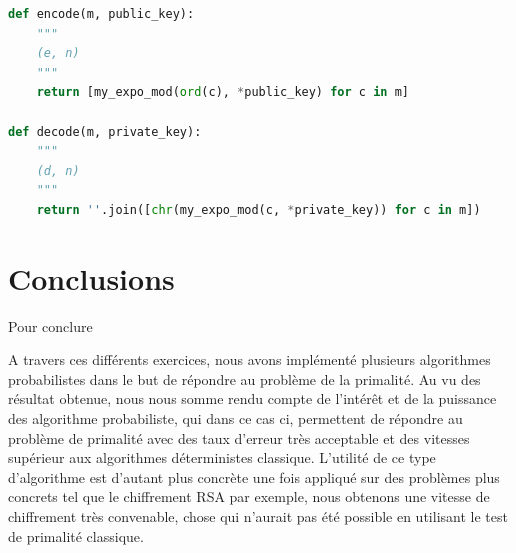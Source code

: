 \documentclass{article}
\begin{document}
\begin{lstlisting}[language=Python, caption=Encodage et décodage]
def encode(m, public_key):
    """
    (e, n)
    """
    return [my_expo_mod(ord(c), *public_key) for c in m]

def decode(m, private_key):
    """
    (d, n)
    """
    return ''.join([chr(my_expo_mod(c, *private_key)) for c in m])
\end{lstlisting}



\section{Conclusions}

Pour conclure

A travers ces différents exercices, nous avons implémenté plusieurs algorithmes probabilistes dans le but de répondre au problème de la primalité. Au vu des résultat obtenue, nous nous somme rendu compte de l'intérêt et de la puissance des algorithme probabiliste, qui dans ce cas ci, permettent de répondre au problème de primalité avec des taux d'erreur très acceptable et des vitesses supérieur aux algorithmes déterministes classique.
L'utilité de ce type d'algorithme est d'autant plus concrète une fois appliqué sur des problèmes plus concrets tel que le chiffrement RSA par exemple, nous obtenons une vitesse de chiffrement très convenable, chose qui n'aurait pas été possible en utilisant le test de primalité classique.
    
\end{document}
